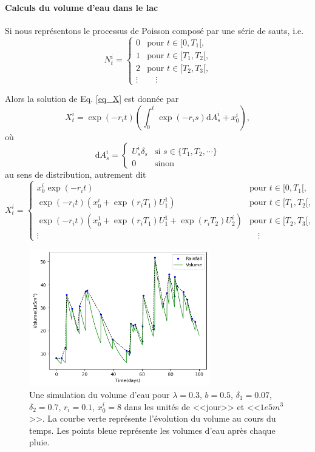 \documentclass{article}
\def \dd {\mathrm{d}}
\begin{document}
\paragraph{Calculs du volume d'eau dans le lac} Si nous représentons le processus de Poisson composé par une série de sauts, i.e.
\[N_t^i = \begin{cases}0&\textrm{pour $t\in [0, T_1[$,}\\
  1&\textrm{pour $t\in [T_1, T_2[$,}\\
  2&\textrm{pour $t\in [T_2, T_3[$,}\\
  \vdots &\quad\vdots\end{cases}\]

Alors la solution de Eq. \ref{eq_X} est donnée par
\[X_t^i = \exp(-r_i t)\left(\int_0^t \exp(-r_i s)\dd A_s^i + x_0^i\right),\]
où \[\dd A_s^i=\begin{cases} U_s^i\delta_s &\text{si } s\in \{T_1,T_2,\cdots\}\\
  0&\text{sinon}\end{cases}\] 
au sens de distribution, autrement dit
\[X_t^i = \begin{cases}x_0^i\exp(-r_i t)&\textrm{pour $t\in [0, T_1[$,}\\
  \exp(-r_i t)(x_0^i+\exp(r_i T_1)U_1^1)&\textrm{pour $t\in [T_1, T_2[$,}\\
  \exp(-r_i t)(x_0^1+\exp(r_i T_1)U_1^1+\exp(r_i T_2)U_2^i)&\textrm{pour $t\in [T_2, T_3[$,}\\
  \vdots &\quad\vdots\end{cases}\]

\begin{figure}[t]
  \centering
  \includegraphics[width=0.7\textwidth]{rainfall.png}
  \caption{Une simulation du volume d'eau pour $\lambda=0.3$, $b=0.5$, $\delta_1=0.07$, $\delta_2=0.7$, $r_i=0.1$, $x_0^i=8$ dans les unités de <<jour>> et <<$1e5m^3$>>. La courbe verte représente l'évolution du volume au cours du temps. Les points bleue représente les volumes d'eau après chaque pluie.}
  \label{v_e}
\end{figure}
\end{document}
